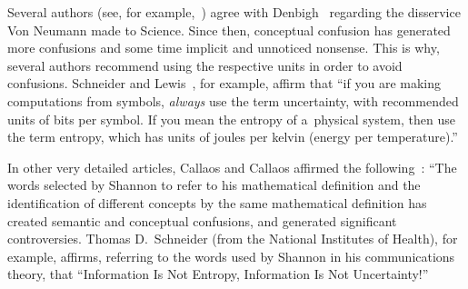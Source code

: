 \begin{multicols}{2}
Several authors (see, for example,~\cite{12-sel}) agree with Denbigh~\cite{11-sel} regarding the disservice Von Neumann made to 
Science. Since then, conceptual confusion has generated more confusions and some time implicit 
and unnoticed nonsense. This is why, several authors recommend using the respective units in 
order to avoid confusions. Schneider and Lewis~\cite{13-sel}, for example, affirm that ``if you are 
making computations from symbols, \textit{always} use the term uncertainty, with recommended 
units of bits per symbol. If you mean the entropy of a~physical system, then use the term entropy, 
which has units of joules per kelvin (energy per temperature).''

In other very detailed articles, Callaos and Callaos affirmed the following~\cite{1-sel, 2-sel}:
``The words selected by Shannon to refer to his mathematical definition and the 
identification of different concepts by the same mathematical definition has created 
semantic and conceptual confusions, and generated significant controversies. Thomas 
D.~Schneider (from the National Institutes of Health), for example, affirms, referring to the 
words used by Shannon in his communications theory, that 
``Information Is Not Entropy,  Information Is Not Uncertainty!'' 


\end{multicols}
